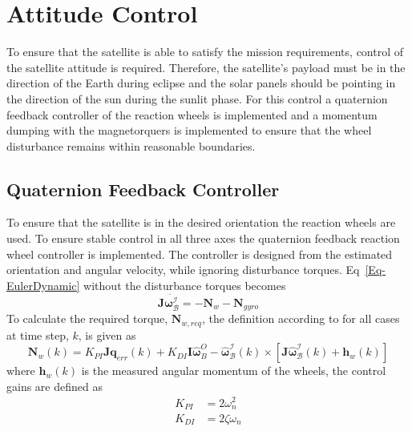 \section{Attitude Control}
To ensure that the satellite is able to satisfy the mission requirements, control of the satellite attitude is required. Therefore, the satellite's payload must be in the direction of the Earth during eclipse and the solar panels should be pointing in the direction of the sun during the sunlit phase. For this control a quaternion feedback controller of the reaction wheels is implemented and a momentum dumping with the magnetorquers is implemented to ensure that the wheel disturbance remains within reasonable boundaries.

\subsection{Quaternion Feedback Controller}
\label{section: Quaternion Feedback Controller}
To ensure that the satellite is in the desired orientation the reaction wheels are used. To ensure stable control in all three axes \cite{wie1989quarternion} the quaternion feedback reaction wheel controller is implemented. The controller is designed from the estimated orientation and angular velocity, while ignoring disturbance torques. Eq~\ref{Eq-EulerDynamic} without the disturbance torques becomes
\begin{equation}
\mathbf{J}\dot{\boldsymbol{\omega}_{\mathcal{B}}^{\mathcal{I}}} = -\mathbf{N}_w - \mathbf{N}_{gyro}
\end{equation}
To calculate the required torque, $\mathbf{N}_{w,req}$, the definition according to \cite{steyn2008attitude} for all cases at time step, $k$, is given as
\begin{equation}
	\mathbf{N}_w(k) = K_{PI}\mathbf{Jq}_{err}(k) + K_{DI}\mathbf{I}\hat{\boldsymbol{\omega}}_B^O - \hat{\boldsymbol{\omega}}_{\mathcal{B}}^{\mathcal{I}}(k) \times [\mathbf{J}\hat{\boldsymbol{\omega}}_{\mathcal{B}}^{\mathcal{I}}(k) + \mathbf{h}_{w}(k)]
\end{equation}
where $\mathbf{h}_{w}(k)$ is the measured angular momentum of the wheels, the control gains are defined as
\begin{equation}
	\begin{aligned}
		K_{PI} &= 2 \omega_n^2\\
		K_{DI} &= 2 \zeta \omega_n \\
	\end{aligned}
	\label{eq:controlGain}
\end{equation}

